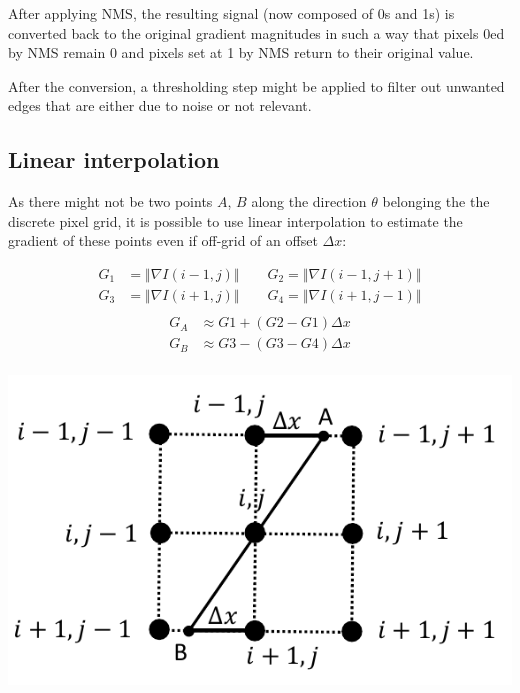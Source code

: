 \begin{remark}
    After applying NMS, the resulting signal (now composed of 0s and 1s) is converted back to the original gradient magnitudes
    in such a way that pixels 0ed by NMS remain 0 and pixels set at 1 by NMS return to their original value.

    After the conversion, a thresholding step might be applied to filter out unwanted edges that are either due to noise or not relevant.
\end{remark}


\subsection{Linear interpolation}

As there might not be two points $A$, $B$ along the direction $\theta$ belonging the the discrete pixel grid,
it is possible to use linear interpolation to estimate the gradient of these points even if off-grid of an offset $\Delta x$:\\
\begin{minipage}{0.6\linewidth}
    \[
        \begin{split}
            G_1 &= \Vert \nabla I(i-1, j) \Vert \hspace{2em} G_2 = \Vert \nabla I(i-1, j+1) \Vert \\
            G_3 &= \Vert \nabla I(i+1, j) \Vert \hspace{2em} G_4 = \Vert \nabla I(i+1, j-1) \Vert \\
        \end{split}
    \]
    \[
        \begin{split}
            G_A &\approx G1 + (G2 - G1)\Delta x \\
            G_B &\approx G3 - (G3 - G4)\Delta x \\
        \end{split}
    \]
\end{minipage}
\begin{minipage}{0.35\linewidth}
    \centering
    \includegraphics[width=\linewidth]{./img/_nms_interpolation.pdf}
\end{minipage}